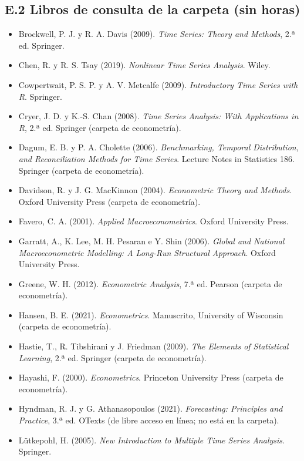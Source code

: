 \documentclass[11pt,a4paper]{article}
\begin{document}
\subsection*{E.2 Libros de consulta de la carpeta (sin horas)}
{\small
\begin{itemize}[leftmargin=1.4em,itemsep=1pt,label={}]
\item Brockwell, P. J. y R. A. Davis (2009). \emph{Time Series: Theory and Methods}, 2.ª ed. Springer.
\item Chen, R. y R. S. Tsay (2019). \emph{Nonlinear Time Series Analysis}. Wiley.
\item Cowpertwait, P. S. P. y A. V. Metcalfe (2009). \emph{Introductory Time Series with R}. Springer.
\item Cryer, J. D. y K.-S. Chan (2008). \emph{Time Series Analysis: With Applications in R}, 2.ª ed. Springer (carpeta de econometría).
\item Dagum, E. B. y P. A. Cholette (2006). \emph{Benchmarking, Temporal Distribution, and Reconciliation Methods for Time Series}. Lecture Notes in Statistics 186. Springer (carpeta de econometría).
\item Davidson, R. y J. G. MacKinnon (2004). \emph{Econometric Theory and Methods}. Oxford University Press (carpeta de econometría).
\item Favero, C. A. (2001). \emph{Applied Macroeconometrics}. Oxford University Press.
\item Garratt, A., K. Lee, M. H. Pesaran e Y. Shin (2006). \emph{Global and National Macroeconometric Modelling: A Long-Run Structural Approach}. Oxford University Press.
\item Greene, W. H. (2012). \emph{Econometric Analysis}, 7.ª ed. Pearson (carpeta de econometría).
\item Hansen, B. E. (2021). \emph{Econometrics}. Manuscrito, University of Wisconsin (carpeta de econometría).
\item Hastie, T., R. Tibshirani y J. Friedman (2009). \emph{The Elements of Statistical Learning}, 2.ª ed. Springer (carpeta de econometría).
\item Hayashi, F. (2000). \emph{Econometrics}. Princeton University Press (carpeta de econometría).
\item Hyndman, R. J. y G. Athanasopoulos (2021). \emph{Forecasting: Principles and Practice}, 3.ª ed. OTexts (de libre acceso en línea; no está en la carpeta).
\item Lütkepohl, H. (2005). \emph{New Introduction to Multiple Time Series Analysis}. Springer.

\end{itemize}}
\end{document}
